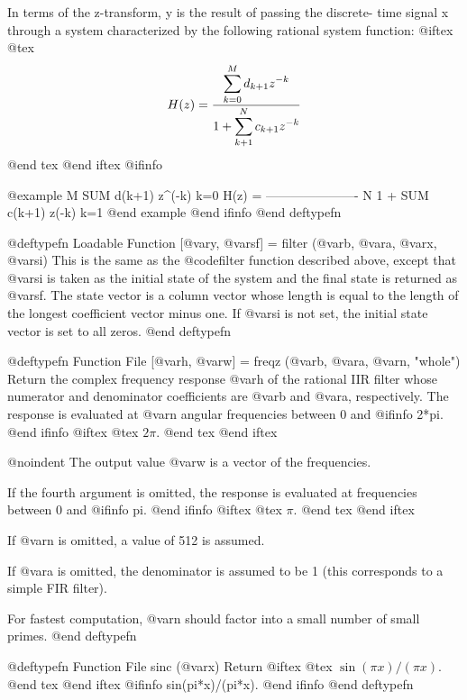 In terms of the z-transform, y is the result of passing the discrete-
time signal x through a system characterized by the following rational
system function:
@iftex
@tex
$$
H(z) = {\displaystyle\sum_{k=0}^M d_{k+1} z^{-k}
        \over 1 + \displaystyle\sum_{k+1}^N c_{k+1} z^{-k}}
$$
@end tex
@end iftex
@ifinfo

@example
             M
            SUM d(k+1) z^(-k)
            k=0
  H(z) = ----------------------
               N
          1 + SUM c(k+1) z(-k)
              k=1
@end example
@end ifinfo
@end deftypefn

@deftypefn {Loadable Function} {[@var{y}, @var{sf}] =} filter (@var{b}, @var{a}, @var{x}, @var{si})
This is the same as the @code{filter} function described above, except
that @var{si} is taken as the initial state of the system and the final
state is returned as @var{sf}.  The state vector is a column vector
whose length is equal to the length of the longest coefficient vector
minus one.  If @var{si} is not set, the initial state vector is set to
all zeros.
@end deftypefn

@deftypefn {Function File} {[@var{h}, @var{w}] =} freqz (@var{b}, @var{a}, @var{n}, "whole")
Return the complex frequency response @var{h} of the rational IIR filter
whose numerator and denominator coefficients are @var{b} and @var{a},
respectively.  The response is evaluated at @var{n} angular frequencies
between 0 and
@ifinfo
 2*pi.
@end ifinfo
@iftex
@tex
 $2\pi$.
@end tex
@end iftex

@noindent
The output value @var{w} is a vector of the frequencies.

If the fourth argument is omitted, the response is evaluated at
frequencies between 0 and
@ifinfo
 pi.
@end ifinfo
@iftex
@tex
 $\pi$.
@end tex
@end iftex

If @var{n} is omitted, a value of 512 is assumed.

If @var{a} is omitted, the denominator is assumed to be 1 (this
corresponds to a simple FIR filter).

For fastest computation, @var{n} should factor into a small number of
small primes.
@end deftypefn

@deftypefn {Function File} {} sinc (@var{x})
Return
@iftex
@tex
$ \sin (\pi x)/(\pi x)$.
@end tex
@end iftex
@ifinfo
 sin(pi*x)/(pi*x).
@end ifinfo
@end deftypefn
